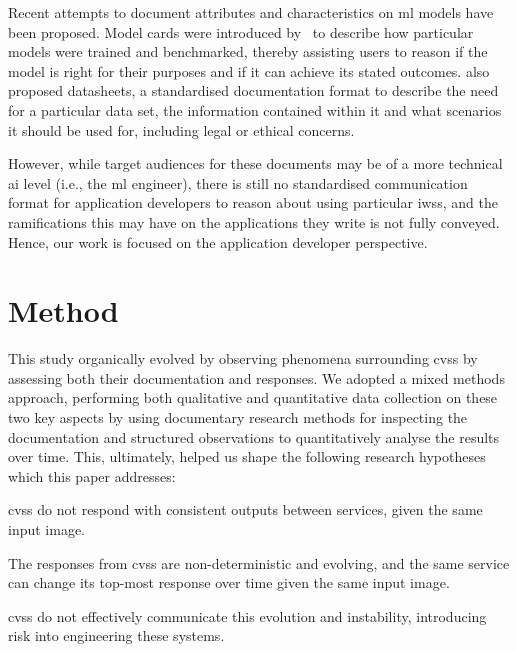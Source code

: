 Recent attempts to document attributes and characteristics on \gls{ml} models have been proposed. Model cards were introduced by~\citet{Mitchell:2018in} to describe how particular models were trained and benchmarked, thereby assisting users to reason if the model is right for their purposes and if it can achieve its stated outcomes. \citet{Gebru:2018wh} also proposed datasheets, a standardised documentation format to describe the need for a particular data set, the information contained within it and what scenarios it should be used for, including legal or ethical concerns. 

However, while target audiences for these documents may be of a more technical \gls{ai} level (i.e., the \gls{ml} engineer), there is still no standardised communication format for application developers to reason about using particular \glspl{iws}, and the ramifications this may have on the applications they write is not fully conveyed. Hence, our work is focused on the application developer perspective. 

\section{Method}
\label{icsme2019:sec:method}

This study organically evolved by observing phenomena surrounding \glspl{cvs} by assessing both their documentation and responses. We adopted a mixed methods approach, performing both qualitative and quantitative data collection on these two key aspects by using documentary research methods for inspecting the documentation and structured observations to quantitatively analyse the results over time. This, ultimately, helped us shape the following research hypotheses which this paper addresses:

\begin{enumerate}[label=\textbf{[RH\arabic*]}, leftmargin=2\parindent]
\item \glspl{cvs} do not respond with consistent outputs between services, given the same input image.
\item The responses from \glspl{cvs} are non-deterministic and evolving, and the same service can change its top-most response over time given the same input image.
\item \glspl{cvs} do not effectively communicate this evolution and instability, introducing risk into engineering these systems.
\end{enumerate}

